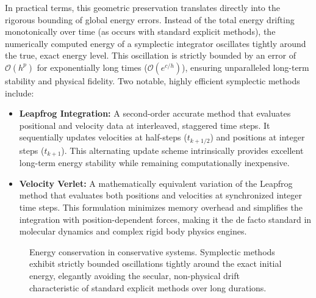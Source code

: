 In practical terms, this geometric preservation translates directly into the rigorous bounding of global energy errors. Instead of the total energy drifting monotonically over time (as occurs with standard explicit methods), the numerically computed energy of a symplectic integrator oscillates tightly around the true, exact energy level. This oscillation is strictly bounded by an error of $\mathcal{O}(h^p)$ for exponentially long times ($\mathcal{O}(e^{c/h})$), ensuring unparalleled long-term stability and physical fidelity.
Two notable, highly efficient symplectic methods include:
\begin{itemize}
    \item \textbf{Leapfrog Integration:} A second-order accurate method that evaluates positional and velocity data at interleaved, staggered time steps. It sequentially updates velocities at half-steps ($t_{k+1/2}$) and positions at integer steps ($t_{k+1}$). This alternating update scheme intrinsically provides excellent long-term energy stability while remaining computationally inexpensive.
    \item \textbf{Velocity Verlet:} A mathematically equivalent variation of the Leapfrog method that evaluates both positions and velocities at synchronized integer time steps. This formulation minimizes memory overhead and simplifies the integration with position-dependent forces, making it the de facto standard in molecular dynamics and complex rigid body physics engines.
\end{itemize}

\begin{figure}[htbp]
    \centering
    \caption{Energy conservation in conservative systems. Symplectic methods exhibit strictly bounded oscillations tightly around the exact initial energy, elegantly avoiding the secular, non-physical drift characteristic of standard explicit methods over long durations.}
    \label{fig:symplectic_energy}
\end{figure}

